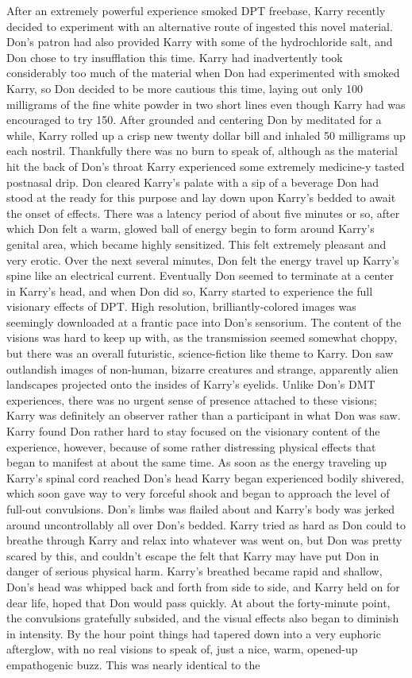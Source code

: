 \documentclass[12pt]{book}
\begin{document}
After an extremely powerful experience smoked DPT freebase, Karry recently decided to experiment with an alternative route of ingested this novel material. Don's patron had also provided Karry with some of the hydrochloride salt, and Don chose to try insufflation this time. Karry had inadvertently took considerably too much of the material when Don had experimented with smoked Karry, so Don decided to be more cautious this time, laying out only 100 milligrams of the fine white powder in two short lines even though Karry had was encouraged to try 150. After grounded and centering Don by meditated for a while, Karry rolled up a crisp new twenty dollar bill and inhaled 50 milligrams up each nostril. Thankfully there was no burn to speak of, although as the material hit the back of Don's throat Karry experienced some extremely medicine-y tasted postnasal drip. Don cleared Karry's palate with a sip of a beverage Don had stood at the ready for this purpose and lay down upon Karry's bedded to await the onset of effects. There was a latency period of about five minutes or so, after which Don felt a warm, glowed ball of energy begin to form around Karry's genital area, which became highly sensitized. This felt extremely pleasant and very erotic. Over the next several minutes, Don felt the energy travel up Karry's spine like an electrical current. Eventually Don seemed to terminate at a center in Karry's head, and when Don did so, Karry started to experience the full visionary effects of DPT. High resolution, brilliantly-colored images was seemingly downloaded at a frantic pace into Don's sensorium. The content of the visions was hard to keep up with, as the transmission seemed somewhat choppy, but there was an overall futuristic, science-fiction like theme to Karry. Don saw outlandish images of non-human, bizarre creatures and strange, apparently alien landscapes projected onto the insides of Karry's eyelids. Unlike Don's DMT experiences, there was no urgent sense of presence attached to these visions; Karry was definitely an observer rather than a participant in what Don was saw. Karry found Don rather hard to stay focused on the visionary content of the experience, however, because of some rather distressing physical effects that began to manifest at about the same time. As soon as the energy traveling up Karry's spinal cord reached Don's head Karry began experienced bodily shivered, which soon gave way to very forceful shook and began to approach the level of full-out convulsions. Don's limbs was flailed about and Karry's body was jerked around uncontrollably all over Don's bedded. Karry tried as hard as Don could to breathe through Karry and relax into whatever was went on, but Don was pretty scared by this, and couldn't escape the felt that Karry may have put Don in danger of serious physical harm. Karry's breathed became rapid and shallow, Don's head was whipped back and forth from side to side, and Karry held on for dear life, hoped that Don would pass quickly. At about the forty-minute point, the convulsions gratefully subsided, and the visual effects also began to diminish in intensity. By the hour point things had tapered down into a very euphoric afterglow, with no real visions to speak of, just a nice, warm, opened-up empathogenic buzz. This was nearly identical to the 
\end{document}
